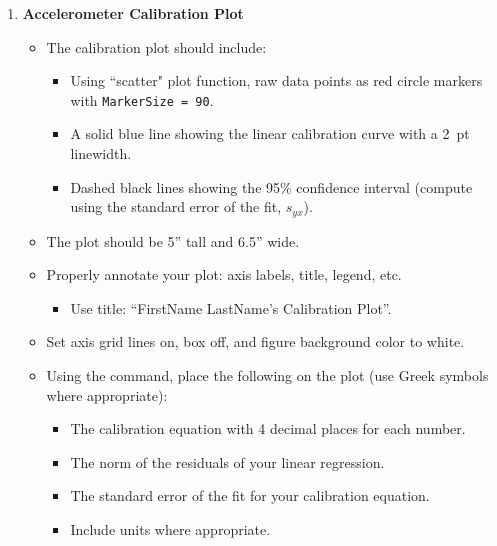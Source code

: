 \documentclass{article} %
\begin{document}
\begin{enumerate}
    \item \textbf{Accelerometer Calibration Plot}
    \begin{itemize}
        \item The calibration plot should include:
        \begin{itemize}
            \item Using ``scatter" plot function, raw data points as red circle markers with \texttt{MarkerSize = 90}.
            \item A solid blue line showing the linear calibration curve with a 2~pt linewidth.
            \item Dashed black lines showing the 95\% confidence interval (compute using the standard error of the fit, $s_{yx}$).
        \end{itemize} 
        \item The plot should be 5'' tall and 6.5'' wide.
        \item Properly annotate your plot: axis labels, title, legend, etc.
        \begin{itemize}
            \item Use title: ``FirstName LastName's Calibration Plot''.
        \end{itemize}
        \item Set axis grid lines on, box off, and figure background color to white.
        \item Using the  command, place the following on the plot (use Greek symbols where appropriate):
        \begin{itemize}
            \item The calibration equation with 4 decimal places for each number.
            \item The norm of the residuals of your linear regression.
            \item The standard error of the fit for your calibration equation.
            \item Include units where appropriate.
        \end{itemize}
    \end{itemize}
 

\end{enumerate}
\end{document}
